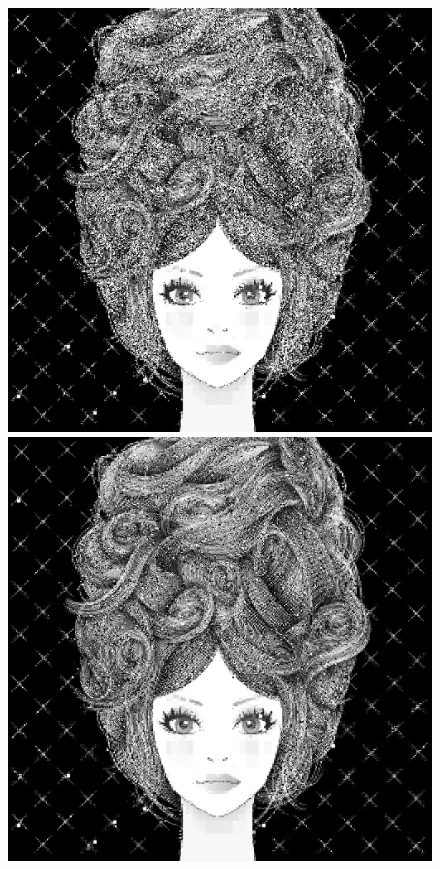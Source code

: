 \documentclass[11pt,a4paper,appendixprefix=true,numbers=noenddot]{scrreprt}
\begin{document}
\begin{figure}[!ht]
\includegraphics[scale=0.35]{images/girl03} 
\includegraphics[scale=0.35]{images/girl04}

\end{figure}
\end{document}
